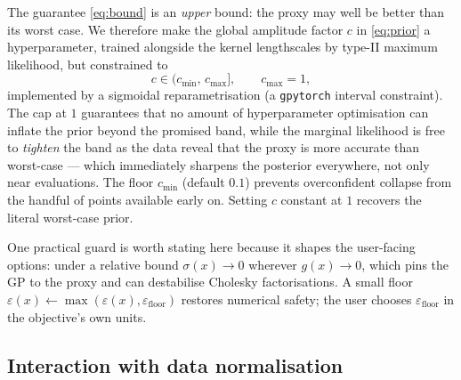 \documentclass[11pt,a4paper]{article}
\begin{document}
The guarantee \eqref{eq:bound} is an \emph{upper} bound: the proxy may well be
better than its worst case. We therefore make the global amplitude factor $c$
in \eqref{eq:prior} a hyperparameter, trained alongside the kernel
lengthscales by type-II maximum likelihood, but constrained to
\begin{equation}
  \label{eq:cap}
  c \in (c_{\min}, \, c_{\max}], \qquad c_{\max} = 1,
\end{equation}
implemented by a sigmoidal reparametrisation (a \texttt{gpytorch}
\citep{gardner2018} interval constraint). The cap at $1$ guarantees that no
amount of hyperparameter optimisation can inflate the prior beyond the
promised band, while the marginal likelihood is free to \emph{tighten} the
band as the data reveal that the proxy is more accurate than worst-case ---
which immediately sharpens the posterior everywhere, not only near
evaluations. The floor $c_{\min}$ (default $0.1$) prevents overconfident
collapse from the handful of points available early on. Setting $c$ constant
at $1$ recovers the literal worst-case prior.

One practical guard is worth stating here because it shapes the user-facing
options: under a relative bound $\sigma(x) \to 0$ wherever $g(x) \to 0$,
which pins the GP to the proxy and can destabilise Cholesky factorisations. A
small floor $\varepsilon(x) \gets \max(\varepsilon(x),
\varepsilon_{\mathrm{floor}})$ restores numerical safety; the user chooses
$\varepsilon_{\mathrm{floor}}$ in the objective's own units.

\subsection{Interaction with data normalisation}
\label{sec:normalisation}
\end{document}
